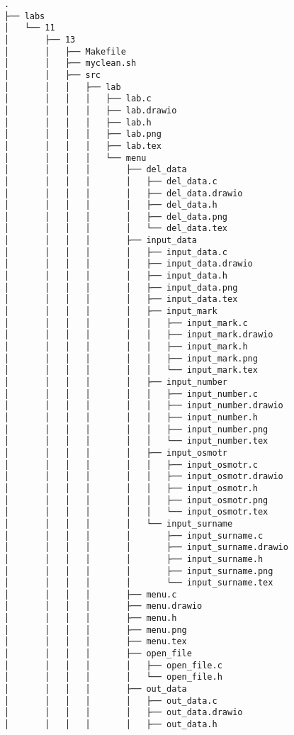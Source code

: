 \begin{verbatim}
.
├── labs
│   └── 11
│       ├── 13
│       │   ├── Makefile
│       │   ├── myclean.sh
│       │   ├── src
│       │   │   ├── lab
│       │   │   │   ├── lab.c
│       │   │   │   ├── lab.drawio
│       │   │   │   ├── lab.h
│       │   │   │   ├── lab.png
│       │   │   │   ├── lab.tex
│       │   │   │   └── menu
│       │   │   │       ├── del_data
│       │   │   │       │   ├── del_data.c
│       │   │   │       │   ├── del_data.drawio
│       │   │   │       │   ├── del_data.h
│       │   │   │       │   ├── del_data.png
│       │   │   │       │   └── del_data.tex
│       │   │   │       ├── input_data
│       │   │   │       │   ├── input_data.c
│       │   │   │       │   ├── input_data.drawio
│       │   │   │       │   ├── input_data.h
│       │   │   │       │   ├── input_data.png
│       │   │   │       │   ├── input_data.tex
│       │   │   │       │   ├── input_mark
│       │   │   │       │   │   ├── input_mark.c
│       │   │   │       │   │   ├── input_mark.drawio
│       │   │   │       │   │   ├── input_mark.h
│       │   │   │       │   │   ├── input_mark.png
│       │   │   │       │   │   └── input_mark.tex
│       │   │   │       │   ├── input_number
│       │   │   │       │   │   ├── input_number.c
│       │   │   │       │   │   ├── input_number.drawio
│       │   │   │       │   │   ├── input_number.h
│       │   │   │       │   │   ├── input_number.png
│       │   │   │       │   │   └── input_number.tex
│       │   │   │       │   ├── input_osmotr
│       │   │   │       │   │   ├── input_osmotr.c
│       │   │   │       │   │   ├── input_osmotr.drawio
│       │   │   │       │   │   ├── input_osmotr.h
│       │   │   │       │   │   ├── input_osmotr.png
│       │   │   │       │   │   └── input_osmotr.tex
│       │   │   │       │   └── input_surname
│       │   │   │       │       ├── input_surname.c
│       │   │   │       │       ├── input_surname.drawio
│       │   │   │       │       ├── input_surname.h
│       │   │   │       │       ├── input_surname.png
│       │   │   │       │       └── input_surname.tex
│       │   │   │       ├── menu.c
│       │   │   │       ├── menu.drawio
│       │   │   │       ├── menu.h
│       │   │   │       ├── menu.png
│       │   │   │       ├── menu.tex
│       │   │   │       ├── open_file
│       │   │   │       │   ├── open_file.c
│       │   │   │       │   └── open_file.h
│       │   │   │       ├── out_data
│       │   │   │       │   ├── out_data.c
│       │   │   │       │   ├── out_data.drawio
│       │   │   │       │   ├── out_data.h

\end{verbatim}
